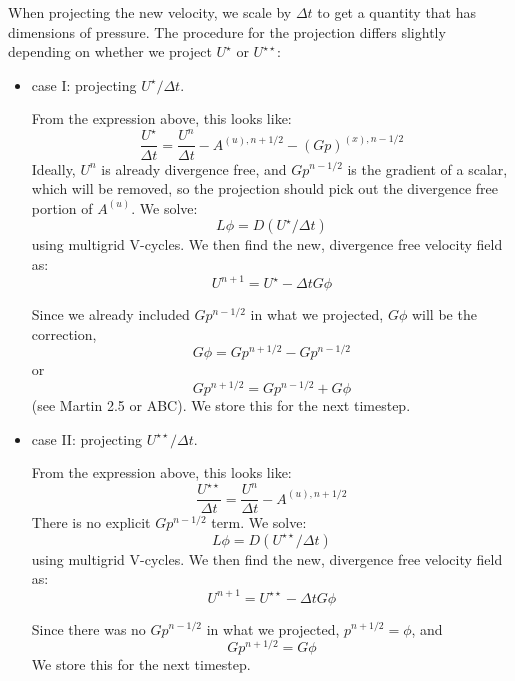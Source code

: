 When projecting the new velocity, we scale by $\Delta t$ to get a quantity
that has dimensions of pressure.  The procedure for the projection
differs slightly depending on whether we project $U^\star$ or $U^{\star\star}$:
\begin{itemize}
\item case I: projecting $U^{\star}/\Delta t$.  

From the expression above,
this looks like:
\begin{equation}
\frac{U^\star}{\Delta t} = \frac{U^n}{\Delta t} - A^{(u),n+1/2} - (G p)^{(x),n-1/2}
\end{equation}
Ideally, $U^n$ is already divergence free, and $Gp^{n-1/2}$ is the
gradient of a scalar, which will be removed, so the projection should
pick out the divergence free portion of $A^{(u)}$.  We solve:
\begin{equation}
L\phi = D (U^\star/\Delta t)
\end{equation}
using multigrid V-cycles.
We then find the new, divergence free velocity field as:
\begin{equation}
U^{n+1} = U^\star - \Delta t G\phi
\end{equation}

Since we already included $Gp^{n-1/2}$ in what we projected, $G\phi$
will be the correction,
\begin{equation}
G\phi = Gp^{n+1/2} - Gp^{n-1/2}
\end{equation}
or
\begin{equation}
Gp^{n+1/2} = Gp^{n-1/2} + G\phi
\end{equation}
(see Martin 2.5 or ABC).  We store this for the next timestep.


\item case II: projecting $U^{\star\star}/\Delta t$.  

From the expression above,
this looks like:
\begin{equation}
\frac{U^{\star\star}}{\Delta t} = \frac{U^n}{\Delta t} - A^{(u),n+1/2} 
\end{equation}
There is no explicit $Gp^{n-1/2}$ term.  We solve:
\begin{equation}
L\phi = D (U^{\star\star}/\Delta t)
\end{equation}
using multigrid V-cycles.
We then find the new, divergence free velocity field as:
\begin{equation}
U^{n+1} = U^{\star\star} - \Delta t G\phi
\end{equation}

Since there was no $Gp^{n-1/2}$ in what we projected, $p^{n+1/2} = \phi$,
and 
\begin{equation}
Gp^{n+1/2} = G\phi
\end{equation}
We store this for the next timestep.
\end{itemize}

